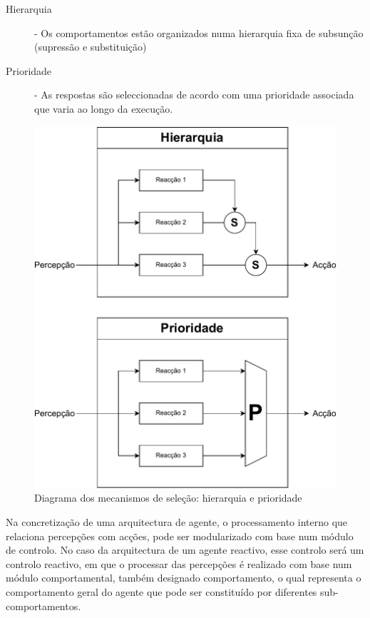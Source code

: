 \documentclass[a4paper,12pt]{article}
\begin{document}
\begin{description}
	\item[Hierarquia] - Os comportamentos estão organizados numa hierarquia fixa de subsunção (supressão e substituição)
	\item[Prioridade] - As respostas são seleccionadas de acordo com uma prioridade associada que varia ao longo da execução.
\end{description}

\begin{figure}[h]
\centering
\includegraphics[scale=0.5]{mecanismosselecao}
\caption{Diagrama dos mecanismos de seleção: hierarquia e prioridade}
\end{figure}

Na concretização de uma arquitectura de agente, o processamento interno que relaciona percepções com acções, pode ser modularizado com base num módulo de controlo.
No caso da arquitectura de um agente reactivo, esse controlo será um controlo reactivo, em que o processar das percepções é realizado com base num módulo comportamental, também designado comportamento, o qual representa o comportamento geral do agente que pode ser constituído por diferentes sub-comportamentos.
\end{document}

